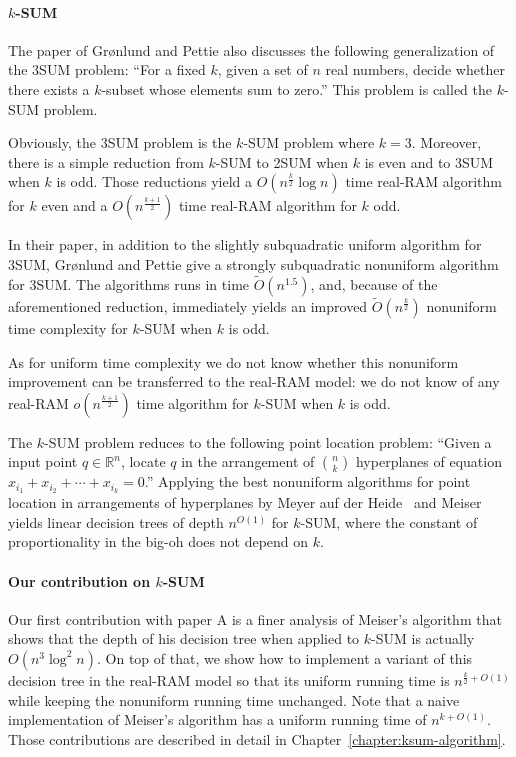 \paragraph{\(k\)-SUM}

The paper of Gr\o nlund and Pettie also discusses the following generalization of
the 3SUM problem: ``For a fixed \(k\), given a set of \(n\) real numbers,
decide whether there exists a \(k\)-subset whose elements sum to zero.''
This problem is called the \(k\)-SUM problem.

Obviously, the 3SUM problem is the \(k\)-SUM problem where \(k=3\).
Moreover, there is a simple reduction from \(k\)-SUM to 2SUM when \(k\) is even
and to 3SUM when \(k\) is odd. Those reductions yield a
\(O(n^{\frac{k}{2}} \log n)\) time real-RAM algorithm for \(k\) even and a
\(O(n^{\frac{k+1}{2}})\) time real-RAM algorithm for \(k\) odd.

In their paper, in addition to the slightly subquadratic uniform algorithm for
3SUM, Gr\o nlund and Pettie give a strongly subquadratic nonuniform
algorithm for 3SUM. The algorithms runs in time \(\tilde{O}(n^{1.5})\), and,
because of the aforementioned reduction, immediately yields an improved
\(\tilde{O}(n^{\frac{k}{2}})\) nonuniform time complexity for \(k\)-SUM when
\(k\) is odd.

As for uniform time complexity we do not know whether this nonuniform
improvement can be transferred to the real-RAM model: we do not know of any
real-RAM \(o(n^{\frac{k+1}{2}})\) time algorithm for \(k\)-SUM when
\(k\) is odd.

The \(k\)-SUM problem reduces to the following point location problem: ``Given
a input point \(q \in \mathbb{R}^n\), locate \(q\) in the arrangement of
\(n \choose k\) hyperplanes of equation \(x_{i_1} + x_{i_2} + \cdots +
x_{i_k} = 0\).'' Applying the best nonuniform algorithms for point location in
arrangements of hyperplanes by Meyer auf der Heide~\cite{M84} and
Meiser~\cite{M93} yields linear decision trees of depth \(n^{O(1)}\) for
\(k\)-SUM, where the constant of proportionality in the big-oh does not depend
on \(k\).

\paragraph{Our contribution on \(k\)-SUM}

Our first contribution with paper A is a finer analysis of Meiser's algorithm
that shows that the depth of his decision tree when applied to \(k\)-SUM is
actually \(O(n^3 \log^2 n)\).  On top of that, we show how to implement a
variant of this decision tree in the real-RAM model so that its uniform running
time is \(n^{\frac{k}{2} + O(1)}\) while keeping the nonuniform running time
unchanged. Note that a naive implementation of Meiser's algorithm has a uniform
running time of \(n^{k + O(1)}\). Those contributions are described in detail
in Chapter~\ref{chapter:ksum-algorithm}.

